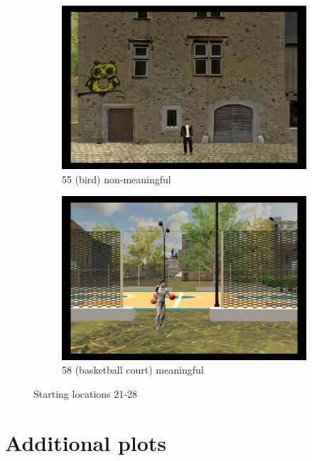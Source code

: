 \begin{figure}[!htb]
	\begin{subfigure}[b]{0.48\linewidth}
		\includegraphics[width=\linewidth]{figures/starting_locations_appx/55_R(bird)_A.PNG}
		\caption{55 (bird) non-meaningful}
		\label{fig:55_R(bird)_A}
	\end{subfigure}
	\begin{subfigure}[b]{0.48\linewidth}
		\includegraphics[width=\linewidth]{figures/starting_locations_appx/58_basketball court_A.PNG}
		\caption{58 (basketball court) meaningful}
		\label{fig:58_basketball court_A}
	\end{subfigure}
	
	\caption[Starting locations 21-28]{Starting locations 21-28}
	\label{fig:starting_locations_21-28}
\end{figure}


\chapter{Additional plots}\label{appx:plots}

